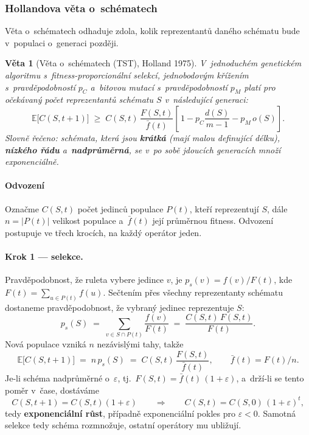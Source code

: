 \documentclass[11pt,a4paper]{article}
\newtheorem{veta}{Věta}[section]
\theoremstyle{definition}
\begin{document}
\subsubsection{Hollandova věta o~schématech}

Věta o~schématech odhaduje zdola, kolik reprezentantů daného schématu bude v~populaci
o~generaci později.

\begin{veta}[Věta o~schématech (TST), Holland 1975]
V~jednoduchém genetickém algoritmu s~fitness-proporcionální selekcí,
jednobodovým křížením s~pravděpodobností $p_C$ a~bitovou mutací
s~pravděpodobností $p_M$ platí pro očekávaný počet reprezentantů schématu $S$
v~následující generaci:
\[
\mathbb{E}\big[C(S,t+1)\big] \;\ge\; C(S,t)\,\frac{F(S,t)}{\bar f(t)}
\left[\,1 - p_C \frac{d(S)}{m-1} - p_M\, o(S)\right].
\]
Slovně řečeno: schémata, která jsou \textbf{krátká} (mají malou definující délku),
\textbf{nízkého řádu} a~\textbf{nadprůměrná}, se v~po sobě jdoucích generacích
množí exponenciálně.
\end{veta}

\paragraph{Odvození}

Označme $C(S,t)$ počet jedinců populace $P(t)$, kteří reprezentují $S$, dále
$n = |P(t)|$ velikost populace a~$\bar f(t)$ její průměrnou fitness. Odvození
postupuje ve třech krocích, na každý operátor jeden.

\paragraph{Krok 1 --- selekce.} Pravděpodobnost, že ruleta vybere jedince $v$, je
$p_s(v) = f(v)/F(t)$, kde $F(t) = \sum_{u \in P(t)} f(u)$. Sečtením přes všechny
reprezentanty schématu dostaneme pravděpodobnost, že vybraný jedinec reprezentuje $S$:
\[
p_s(S) \;=\; \sum_{v \in S \cap P(t)} \frac{f(v)}{F(t)}
\;=\; \frac{C(S,t)\,F(S,t)}{F(t)}.
\]
Nová populace vzniká $n$ nezávislými tahy, takže
\[
\mathbb{E}\big[C(S,t+1)\big] \;=\; n\, p_s(S) \;=\; C(S,t)\,\frac{F(S,t)}{\bar f(t)},
\qquad \bar f(t) = F(t)/n .
\]
Je-li schéma nadprůměrné o~$\varepsilon$, tj.\
$F(S,t) = \bar f(t)\,(1+\varepsilon)$, a~drží-li se tento poměr v~čase, dostáváme
\[
C(S,t+1) = C(S,t)(1+\varepsilon)
\qquad\Longrightarrow\qquad
C(S,t) = C(S,0)\,(1+\varepsilon)^{t},
\]
tedy \textbf{exponenciální růst}, případně exponenciální pokles pro $\varepsilon<0$.
Samotná selekce tedy schéma rozmnožuje, ostatní operátory mu ubližují.
\end{document}
